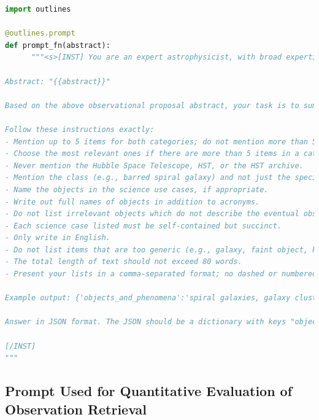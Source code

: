 \documentclass{article} %
\begin{document}
\begin{lstlisting}[language=Python]
import outlines 

@outlines.prompt
def prompt_fn(abstract):
      """<s>[INST] You are an expert astrophysicist, with broad expertise across observational and theoretical astrophysics. You are able to extract core information from astrophysical texts.

Abstract: "{{abstract}}"

Based on the above observational proposal abstract, your task is to summarize the nature of the eventual observations. You will identify the astrophysical objects and phenomena, as well as the potential science use cases described in the abstract. 

Follow these instructions exactly:
- Mention up to 5 items for both categories; do not mention more than 5 items in either category. 
- Choose the most relevant ones if there are more than 5 items in a category.
- Never mention the Hubble Space Telescope, HST, or the HST archive.
- Mention the class (e.g., barred spiral galaxy) and not just the specific instance (e.g., Andromeda).
- Name the objects in the science use cases, if appropriate.
- Write out full names of objects in addition to acronyms.
- Do not list irrelevant objects which do not describe the eventual observation, such as units or proposal Cycle numbers. List fewer but more relevant objects, if in doubt.
- Each science case listed must be self-contained but succinct.
- Only write in English.
- Do not list items that are too generic (e.g., galaxy, faint object, kinematics)
- The total length of text should not exceed 80 words.
- Present your lists in a comma-separated format; no dashed or numbered lists.

Example output: {'objects_and_phenomena':'spiral galaxies, galaxy clusters, supernova remnants', 'science_use_cases':'model galactic structure and evolution, characterize dark matter distribution in clusters, analyze expansion rates of supernova remnants'}

Answer in JSON format. The JSON should be a dictionary with keys "objects_and_phenomena" and "science_use_cases".

[/INST]
"""
\end{lstlisting}

\subsection{Prompt Used for Quantitative Evaluation of Observation Retrieval}
\label{app:quanteval_prompt}
\end{document}
